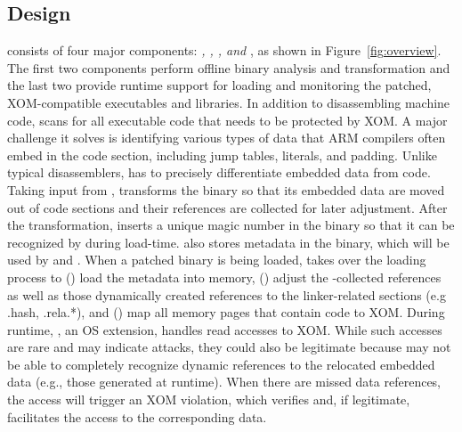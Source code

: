 \subsection{Design}
\label{norax:sec:design}

\NORAX consists of four major components: \emph{
\NDisassembler,
\NPatcher,
\NLoader,
and \NMonitor}, as shown in Figure~\ref{fig:overview}. The first two components perform offline binary analysis and transformation and the last two provide runtime support for loading and monitoring the patched, XOM-compatible executables and libraries. 
In addition to disassembling machine code, \NDisassembler scans for all executable code that needs to be protected by XOM. A major challenge it solves is identifying various types of data that ARM compilers often embed in the code section, including jump tables, literals, and padding. Unlike typical disassemblers, \NDisassembler has to precisely differentiate embedded data from code. 
Taking input from \NDisassembler, \NPatcher transforms the binary so that its embedded data are moved out of code sections and their references are collected for later adjustment. 
After the transformation, \NPatcher inserts a unique magic number in the binary so that it can be recognized by \NLoader during load-time. 
\NPatcher also stores \NORAX metadata in the binary, which will be used by \NLoader and \NMonitor. 
When a patched binary is being loaded, \NLoader takes over the loading process to () load the \NORAX metadata into memory, () adjust the \NPatcher-collected references as well as those dynamically created references to the linker-related sections (e.g .hash, .rela.*), and () map all memory pages that contain code to XOM.
During runtime, 
\NMonitor, an OS extension, handles read accesses to XOM. While such accesses are rare and may indicate attacks, they could also be legitimate because \NPatcher may not be able to completely recognize dynamic references to the relocated embedded data (e.g., those generated at runtime). When there are missed data references, the access will trigger an XOM violation, which \NMonitor verifies and, if legitimate, facilitates the access to the corresponding data. 


